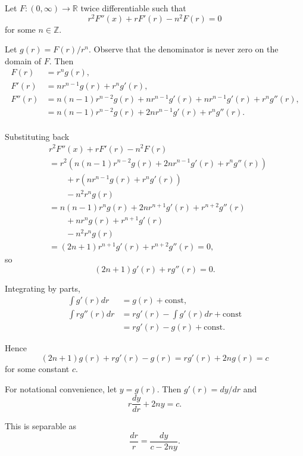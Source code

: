 \documentclass[oneside]{article}
\newcommand\bbR{\mathbb{R}}
\newcommand\bbZ{\mathbb{Z}}
\begin{document}
Let $F : (0, \infty) \to \bbR$ twice differentiable such that \[
  r^2F''(x) + rF'(r) - n^2F(r) = 0
\] for some $n \in \bbZ$.

Let $g(r) = F(r)/r^n$. Observe that the denominator is never zero on the domain
of $F$. Then \begin{align*}
  F(r) &= r^ng(r)\text{,} \\
  F'(r) &= nr^{n-1}g(r) + r^ng'(r)\text{,} \\
  F''(r) &= n(n-1)r^{n-2}g(r) + nr^{n-1}g'(r) + nr^{n-1}g'(r) + r^ng''(r)\text{,} \\
  &= n(n-1)r^{n-2}g(r) + 2nr^{n-1}g'(r) + r^ng''(r)\text{.} \\
\end{align*}

Substituting back\begin{align*}
&r^2F''(x) + rF'(r) - n^2F(r) \\
&= r^2\left(n(n-1)r^{n-2}g(r) + 2nr^{n-1}g'(r) + r^ng''(r)\right) \\
&\qquad+ r\left(nr^{n-1}g(r) + r^ng'(r)\right) \\
&\qquad- n^2r^ng(r) \\
&= n(n-1)r^ng(r) + 2nr^{n+1}g'(r) + r^{n+2}g''(r) \\
&\qquad+ nr^ng(r) + r^{n+1}g'(r) \\
&\qquad- n^2r^ng(r) \\
&= (2n + 1)r^{n+1}g'(r) + r^{n+2}g''(r) = 0\text{,}
\end{align*} so\[
  (2n + 1)g'(r) + rg''(r) = 0\text{.}
\]

Integrating by parts,\begin{align*}
  \int g'(r)dr &= g(r) + \mathrm{const}\text{,} \\
  \int rg''(r)dr &= rg'(r) - \int g'(r)dr + \mathrm{const} \\
  &= rg'(r) - g(r) + \mathrm{const} \text{.}
\end{align*}

Hence\[
  (2n + 1)g(r) + rg'(r) - g(r) = rg'(r) + 2ng(r) = c
\] for some constant $c$.

For notational convenience, let $y = g(r)$. Then $g'(r) = dy/dr$ and \[
  r\frac{dy}{dr} + 2ny = c \text{.}
\]

This is separable as \[
  \frac{dr}{r} = \frac{dy}{c-2ny} \text{.}
\]
\end{document}
